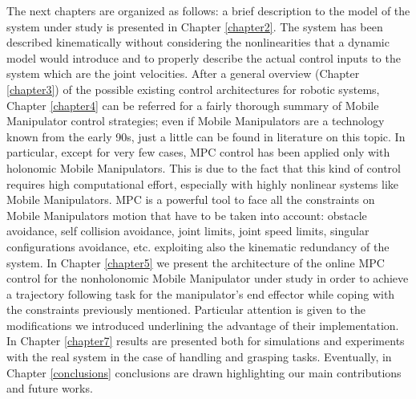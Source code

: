The next chapters are organized as follows: a brief description to the model of the system under study is presented in Chapter \ref{chapter2}. The system has been described kinematically without considering the nonlinearities that a dynamic model would introduce and to properly describe the actual control inputs to the system which are the joint velocities. After a general overview (Chapter \ref{chapter3}) of the possible existing control architectures for robotic systems, Chapter \ref{chapter4} can be referred for a fairly thorough summary of Mobile Manipulator control strategies; even if Mobile Manipulators are a technology known from the early 90s, just a little can be found in literature on this topic. In particular, except for very few cases, MPC control has been applied only with holonomic Mobile Manipulators. This is due to the fact that this kind of control requires high computational effort, especially with highly nonlinear systems like Mobile Manipulators. MPC is a powerful tool to face all the constraints on Mobile Manipulators motion that have to be taken into account: obstacle avoidance, self collision avoidance, joint limits, joint speed limits, singular configurations avoidance, etc. exploiting also the kinematic redundancy of the system.
In Chapter \ref{chapter5} we present the architecture of the online MPC control for the nonholonomic Mobile Manipulator under study in order to achieve a trajectory following task for the manipulator's end effector while coping with the constraints previously mentioned. Particular attention is given to the modifications we introduced underlining the advantage of their implementation. In Chapter \ref{chapter7} results are presented both for simulations and experiments with the real system in the case of handling and grasping tasks. Eventually, in Chapter \ref{conclusions} conclusions are drawn highlighting our main contributions and future works.